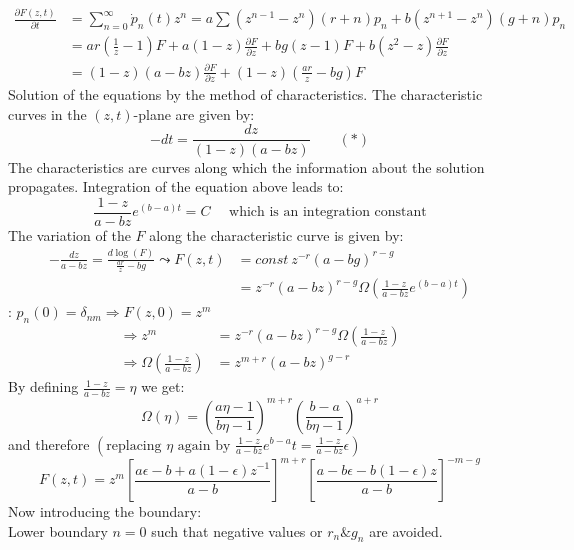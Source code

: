 \begin{align*}
	\frac{\partial F(z,t)}{\partial t}&=\sum\limits_{n=0}^\infty \dot{p}_n(t)z^n=a\sum \left(z^{n-1}-z^n\right)(r+n)p_n+b\left(z^{n+1}-z^n\right)(g+n)p_n\\
	&=ar(\frac{1}{z}-1)F+a(1-z)\frac{\partial F}{\partial z}+bg(z-1)F+b(z^2-z)\frac{\partial F}{\partial z}\\
	&=(1-z)(a-bz)\frac{\partial F}{\partial z}+(1-z)\left(\frac{ar}{z}-bg\right)F
\end{align*}
Solution of the equations by the method of characteristics. The characteristic curves in the $(z,t)$-plane are given by:
\begin{equation*}
	-dt=\frac{dz}{(1-z)(a-bz)} \qquad (\ast)
\end{equation*}
The characteristics are curves along which the information about the solution propagates. Integration of the equation above leads to:
\begin{equation*}
	\frac{1-z}{a-bz}e^{(b-a)t}=C \quad\text{ which is an integration constant}
\end{equation*}
The variation of the $F$ along the characteristic curve is given by:
\begin{align*}
	-\frac{dz}{a-bz}=\frac{d\log(F)}{\frac{ar}{z}-bg}\leadsto F(z,t)&=const\ z^{-r}(a-bg)^{r-g}\\
	&=z^{-r}(a-bz)^{r-g} \Omega \left(\frac{1-z}{a-bz}e^{(b-a)t}\right)
\end{align*}
\underline{}: $p_n(0)=\delta_{nm} \Rightarrow F(z,0)=z^m$
\begin{align*}
	\Rightarrow z^m&=z^{-r}(a-bz)^{r-g}\Omega\left(\frac{1-z}{a-bz}\right)\\
	\Rightarrow \Omega\left(\frac{1-z}{a-bz}\right)&=z^{m+r}(a-bz)^{g-r}
\end{align*}
By defining $\frac{1-z}{a-bz}=\eta$ we get:
\begin{equation*}
	\Omega(\eta)=\left(\frac{a\eta-1}{b\eta-1}\right)^{m+r}\left(\frac{b-a}{b\eta -1}\right)^{a+r}
\end{equation*}
and therefore $\left(\text{replacing $\eta$ again by } \frac{1-z}{a-bz}e^{b-a}t=\frac{1-z}{a-bz}\epsilon\right)$
\begin{equation*}
	F(z,t)=z^m\left[\frac{a\epsilon -b+a(1-\epsilon)z^{-1}}{a-b}\right]^{m+r}\left[\frac{a-b\epsilon -b(1-\epsilon)z}{a-b}\right]^{-m-g}
\end{equation*}
Now introducing the boundary:\\
Lower boundary $n=0$ such that negative values or $r_n\& g_n$ are avoided.

